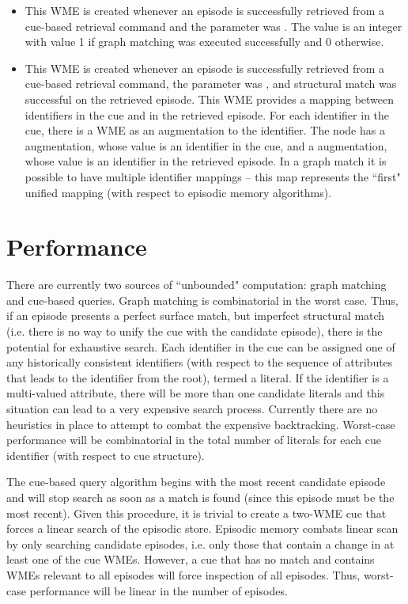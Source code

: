 \begin{itemize}
\item {}
	This WME is created whenever an episode is successfully retrieved from a cue-based retrieval command and the  parameter was . The value is an integer with value 1 if graph matching was executed successfully and 0 otherwise.
\item {}
	This WME is created whenever an episode is successfully retrieved from a cue-based retrieval command, the  parameter was , and structural match was successful on the retrieved episode. This WME provides a mapping between identifiers in the cue and in the retrieved episode. For each identifier in the cue, there is a  WME as an augmentation to the  identifier. The node has a  augmentation, whose value is an identifier in the cue, and a  augmentation, whose value is an identifier in the retrieved episode. In a graph match it is possible to have multiple identifier mappings -- this map represents the ``first" unified mapping (with respect to episodic memory algorithms).
\end{itemize}

\section{Performance}
\label{EPMEM-perf}

There are currently two sources of ``unbounded" computation: graph matching and cue-based queries.
Graph matching is combinatorial in the worst case.
Thus, if an episode presents a perfect surface match, but imperfect structural match (i.e. there is no way to unify the cue with the candidate episode), there is the potential for exhaustive search.
Each identifier in the cue can be assigned one of any historically consistent identifiers (with respect to the sequence of attributes that leads to the identifier from the root), termed a literal.
If the identifier is a multi-valued attribute, there will be more than one candidate literals and this situation can lead to a very expensive search process.
Currently there are no heuristics in place to attempt to combat the expensive backtracking.
Worst-case performance will be combinatorial in the total number of literals for each cue identifier (with respect to cue structure).

The cue-based query algorithm begins with the most recent candidate episode and will stop search as soon as a match is found (since this episode must be the most recent).
Given this procedure, it is trivial to create a two-WME cue that forces a linear search of the episodic store.
Episodic memory combats linear scan by only searching candidate episodes, i.e. only those that contain a change in at least one of the cue WMEs.
However, a cue that has no match and contains WMEs relevant to all episodes will force inspection of all episodes.
Thus, worst-case performance will be linear in the number of episodes.


